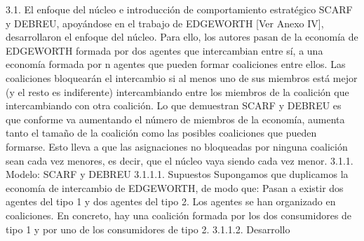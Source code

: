 \documentclass[10pt,a4paper]{article}
\begin{document}
3.1. El enfoque del núcleo e introducción de comportamiento estratégico
SCARF y DEBREU, apoyándose en el trabajo de EDGEWORTH [Ver Anexo IV], desarrollaron el enfoque del núcleo. 
Para ello, los autores pasan de la economía de EDGEWORTH formada por dos agentes que intercambian entre sí, a una economía formada por n agentes que pueden formar coaliciones entre ellos. Las coaliciones bloquearán el intercambio si al menos uno de sus miembros está mejor (y el resto es indiferente) intercambiando entre los miembros de la coalición que intercambiando con otra coalición. 
Lo que demuestran SCARF y DEBREU es que conforme va aumentando el número de miembros de la economía, aumenta tanto el tamaño de la coalición como las posibles coaliciones que pueden formarse. Esto lleva a que las asignaciones no bloqueadas por ninguna coalición sean cada vez menores, es decir, que el núcleo vaya siendo cada vez menor.
3.1.1. Modelo: SCARF y DEBREU
3.1.1.1. Supuestos
Supongamos que duplicamos la economía de intercambio de EDGEWORTH, de modo que:
	Pasan a existir dos agentes del tipo 1 y dos agentes del tipo 2. 
	Los agentes se han organizado en coaliciones. En concreto, hay una coalición formada por los dos consumidores de tipo 1 y por uno de los consumidores de tipo 2.
3.1.1.2. Desarrollo 
 
\end{document}
